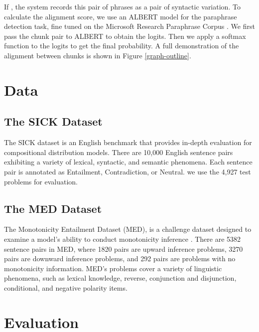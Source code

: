 \documentclass[11pt,a4paper]{article}
\begin{document}
If , the system records this pair of phrases as a pair of syntactic variation. To calculate the alignment score, we use an ALBERT \cite{Lan2020ALBERT:} model for the paraphrase detection task, fine tuned on the Microsoft Research Paraphrase Corpus \cite{dolan-brockett-2005-automatically}. We first pass the chunk pair to ALBERT to obtain the logits. Then we apply a softmax function to the logits to get the final probability. A full demonstration of the alignment between chunks is shown in Figure \ref{graph-outline}.

\section{Data}
\subsection{The SICK Dataset}
The SICK \cite{marelli-etal-2014-sick} dataset is an English benchmark that provides in-depth evaluation for compositional distribution models. There are 10,000 English sentence pairs exhibiting a variety of lexical, syntactic, and semantic phenomena. Each sentence pair is annotated as Entailment, Contradiction, or Neutral. we use the 4,927 test problems for evaluation.

\subsection{The MED Dataset}
The Monotonicity Entailment Dataset (MED), is a challenge dataset designed to examine a model's ability to conduct monotonicity inference \citep{yanaka-etal-2019-neural}. There are 5382 sentence pairs in MED, where 1820 pairs are upward inference problems, 3270 pairs are downward inference problems, and 292 pairs are problems
with no monotonicity information. MED's problems cover a variety of linguistic phenomena, such as lexical knowledge, reverse, conjunction and disjunction, conditional, and negative polarity items.


\section{Evaluation}
\end{document}

